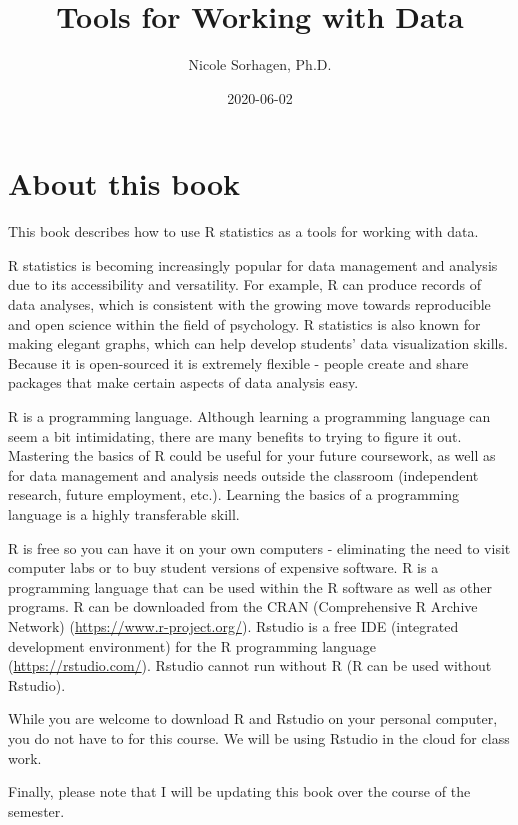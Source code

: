 \documentclass[
]{book}
\title{Tools for Working with Data}
\author{Nicole Sorhagen, Ph.D.}
\date{2020-06-02}
\begin{document}
\maketitle

{
\setcounter{tocdepth}{1}
\tableofcontents
}
\hypertarget{about-this-book}{%
\chapter{About this book}\label{about-this-book}}

This book describes how to use R statistics as a tools for working with data.

R statistics is becoming increasingly popular for data management and analysis due to its accessibility and versatility. For example, R can produce records of data analyses, which is consistent with the growing move towards reproducible and open science within the field of psychology. R statistics is also known for making elegant graphs, which can help develop students' data visualization skills. Because it is open-sourced it is extremely flexible - people create and share packages that make certain aspects of data analysis easy.

R is a programming language. Although learning a programming language can seem a bit intimidating, there are many benefits to trying to figure it out. Mastering the basics of R could be useful for your future coursework, as well as for data management and analysis needs outside the classroom (independent research, future employment, etc.). Learning the basics of a programming language is a highly transferable skill.

R is free so you can have it on your own computers - eliminating the need to visit computer labs or to buy student versions of expensive software. R is a programming language that can be used within the R software as well as other programs. R can be downloaded from the CRAN (Comprehensive R Archive Network) (\url{https://www.r-project.org/}). Rstudio is a free IDE (integrated development environment) for the R programming language (\url{https://rstudio.com/}). Rstudio cannot run without R (R can be used without Rstudio).

While you are welcome to download R and Rstudio on your personal computer, you do not have to for this course. We will be using Rstudio in the cloud for class work.

Finally, please note that I will be updating this book over the course of the semester.
\end{document}
